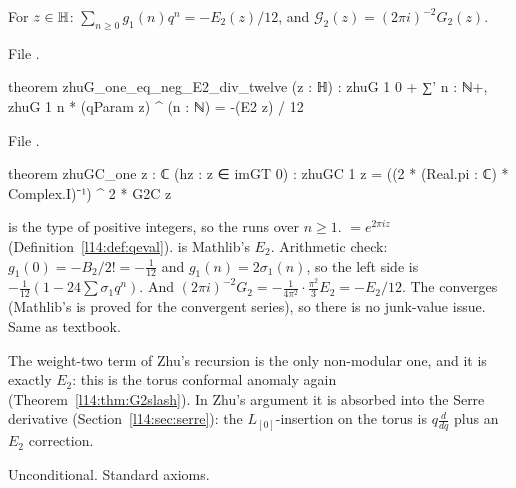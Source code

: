 \begin{theorem}[The anomalous weight $j=1$]\label{l14:thm:zhuGCone}
For $z\in\mathbb{H}$: $\sum_{n\ge0}g_1(n)q^n = -E_2(z)/12$, and $\mathcal G_2(z) = (2\pi i)^{-2}G_2(z)$.
\end{theorem}
\noindent File .
\begin{leancode}
theorem zhuG_one_eq_neg_E2_div_twelve (z : ℍ) :
    zhuG 1 0 + ∑' n : ℕ+, zhuG 1 n * (qParam z) ^ (n : ℕ) = -(E2 z) / 12
\end{leancode}
\noindent File .
\begin{leancode}
theorem zhuGC_one {z : ℂ} (hz : z ∈ imGT 0) :
    zhuGC 1 z = ((2 * (Real.pi : ℂ) * Complex.I)⁻¹) ^ 2 * G2C z
\end{leancode}
\begin{dictionary}
 is the type of positive integers, so the  runs over $n\ge1$.  $=e^{2\pi iz}$
(Definition~\ref{l14:def:qeval}).  is Mathlib's $E_2$. Arithmetic check: $g_1(0) = -B_2/2! = -\tfrac1{12}$ and
$g_1(n) = 2\sigma_1(n)$, so the left side is $-\tfrac1{12}(1 - 24\sum\sigma_1q^n)$. And $(2\pi i)^{-2}G_2 =
-\frac{1}{4\pi^2}\cdot\frac{\pi^2}{3}E_2 = -E_2/12$. The  converges (Mathlib's  is proved
for the convergent series), so there is no junk-value issue. Same as textbook.
\end{dictionary}
\begin{physics}
The weight-two term of Zhu's recursion is the only non-modular one, and it is exactly $E_2$: this is the torus conformal
anomaly again (Theorem~\ref{l14:thm:G2slash}). In Zhu's argument it is absorbed into the Serre derivative
(Section~\ref{l14:sec:serre}): the $L_{[0]}$-insertion on the torus is $q\frac{d}{dq}$ plus an $E_2$ correction.
\end{physics}
\begin{status}
Unconditional. Standard axioms.
\end{status}

